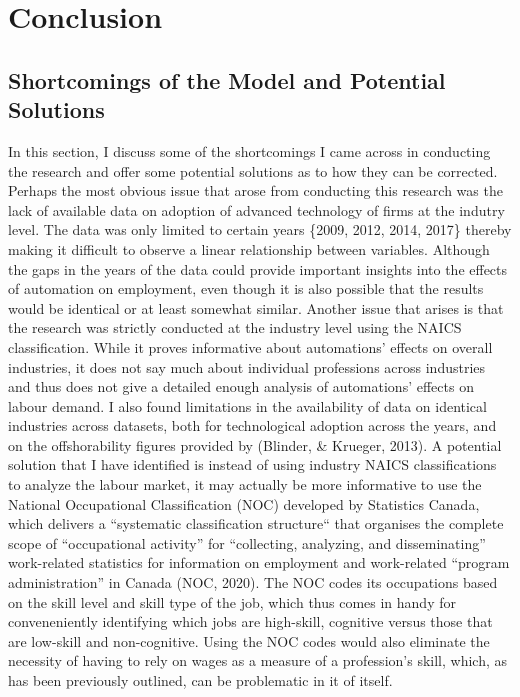 \documentclass[12pt]{article}
\begin{document}
\newpage

\section{Conclusion}

\subsection{Shortcomings of the Model and Potential Solutions}

\begin{flushleft}
In this section, I discuss some of the shortcomings I came across in conducting the research and offer some potential solutions as to how they can be corrected.
\break
\linebreak
Perhaps the most obvious issue that arose from conducting this research was the lack of available data on adoption of advanced technology of firms at the indutry level. The data was only limited to certain years {\{2009, 2012, 2014, 2017\}} thereby making it difficult to observe a linear relationship between variables. Although the gaps in the years of the data could provide important insights into the effects of automation on employment, even though it is also possible that the results would be identical or at least somewhat similar.
\break
\linebreak
Another issue that arises is that the research was strictly conducted at the industry level using the NAICS classification. While it proves informative about automations' effects on overall industries, it does not say much about individual professions across industries and thus does not give a detailed enough analysis of automations' effects on labour demand. I also found limitations in the availability of data on identical industries across datasets, both for technological adoption across the years, and on the offshorability figures provided by (Blinder, \& Krueger, 2013).
\break
\linebreak
A potential solution that I have identified is instead of using industry NAICS classifications to analyze the labour market, it may actually be more informative to use the National Occupational Classification (NOC) developed by Statistics Canada, which delivers a “systematic classification structure“ that organises the complete scope of “occupational activity” for “collecting, analyzing, and disseminating” work-related statistics for information on employment and work-related “program administration” in Canada (NOC, 2020). The NOC codes its occupations based on the skill level and skill type of the job, which thus comes in handy for conveneniently identifying which jobs are high-skill, cognitive versus those that are low-skill and non-cognitive. Using the NOC codes would also eliminate the necessity of having to rely on wages as a measure of a profession's skill, which, as has been previously outlined, can be problematic in it of itself.

\end{flushleft}
\end{document}
